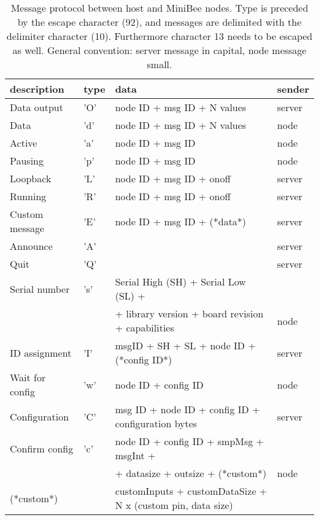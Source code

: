 \documentclass[letterpaper,10pt]{article}
\begin{document}
\begin{table}
 
\begin{center}
\begin{tabular}{llll}
description & type & data & sender\\
\hline
Data output & 'O' & node ID + msg ID + N values & server\\
Data & 'd' & node ID + msg ID + N values & node\\
Active & 'a' & node ID + msg ID & node\\
Pausing & 'p' & node ID + msg ID & node\\
Loopback & 'L' & node ID + msg ID + onoff & server\\
Running & 'R' & node ID + msg ID + onoff & server\\
Custom message & 'E' & node ID + msg ID + (*data*) & server\\
\hline
Announce & 'A' &  & server \\
Quit & 'Q' &  & server \\
Serial number & 's' & Serial High (SH) + Serial Low (SL) +& \\
			&	  & + library version + board revision + capabilities & node\\
ID assignment & 'I' & msgID + SH + SL + node ID + (*config ID*) & server \\
Wait for config & 'w' & node ID + config ID & node \\
Configuration & 'C' & msg ID + node ID + config ID + configuration bytes & server \\
Confirm config & 'c' & node ID + config ID + smpMsg + msgInt + & \\
                           &        & + datasize + outsize + (*custom*) & node \\
(*custom*) &  & customInputs + customDataSize + N x (custom pin, data size) & \\
\hline
\end{tabular}
\end{center}
\caption{Message protocol between host and MiniBee nodes. Type is preceded by the escape character (92), and messages are delimited with the delimiter character (10). Furthermore character 13 needs to be escaped as well. General convention: server message in capital, node message small.}
\end{table}
\end{document}
